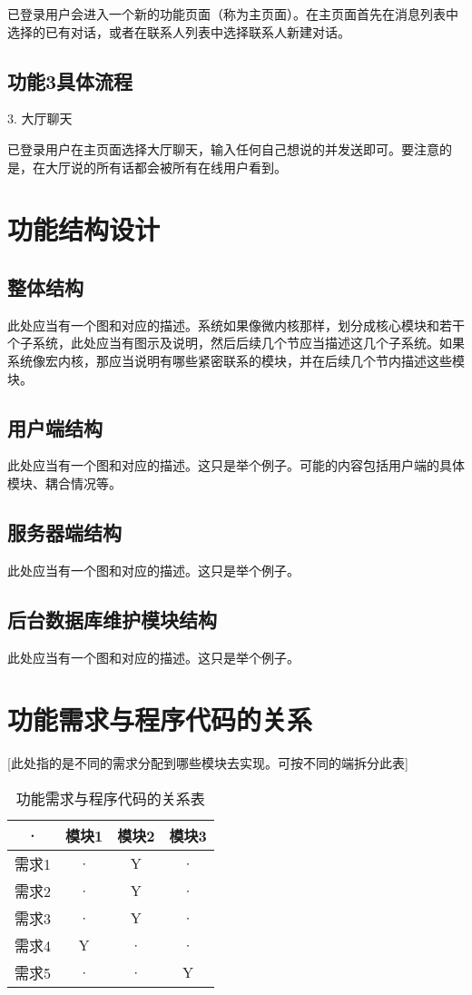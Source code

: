 已登录用户会进入一个新的功能页面（称为主页面）。在主页面首先在消息列表中选择的已有对话，或者在联系人列表中选择联系人新建对话。

\subsection{功能3具体流程}
3. 大厅聊天

已登录用户在主页面选择大厅聊天，输入任何自己想说的并发送即可。要注意的是，在大厅说的所有话都会被所有在线用户看到。



\section{功能结构设计}
\subsection{整体结构}
此处应当有一个图和对应的描述。系统如果像微内核那样，划分成核心模块和若干个子系统，此处应当有图示及说明，然后后续几个节应当描述这几个子系统。如果系统像宏内核，那应当说明有哪些紧密联系的模块，并在后续几个节内描述这些模块。

\subsection{用户端结构}
此处应当有一个图和对应的描述。这只是举个例子。可能的内容包括用户端的具体模块、耦合情况等。

\subsection{服务器端结构}
此处应当有一个图和对应的描述。这只是举个例子。

\subsection{后台数据库维护模块结构}
此处应当有一个图和对应的描述。这只是举个例子。



\section{功能需求与程序代码的关系}
[此处指的是不同的需求分配到哪些模块去实现。可按不同的端拆分此表]
\begin{table}[htbp]
\centering
\caption{功能需求与程序代码的关系表} \label{tab:requirement-module}
\begin{tabular}{|c|c|c|c|}
    \hline
    · & 模块1 & 模块2 & 模块3 \\
    \hline
    需求1 & · & Y & · \\
    \hline
    需求2 & · & Y & · \\
    \hline
    需求3 & · & Y & · \\
    \hline
    需求4 & Y & · & · \\
    \hline
    需求5 & · & · & Y \\
    \hline
\end{tabular}
\end{table}